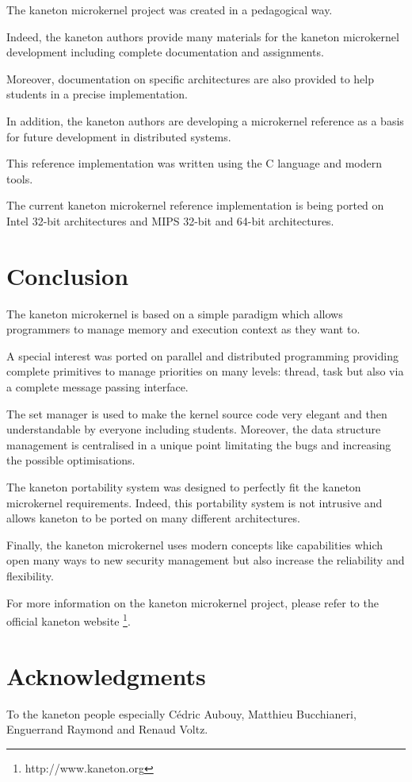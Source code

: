 \begin{multicols}{2}
The kaneton microkernel project was created in a pedagogical way.

Indeed, the kaneton authors provide many materials for the kaneton
microkernel development including complete documentation and assignments.

Moreover, documentation on specific architectures are also provided
to help students in a precise implementation.

In addition, the kaneton authors are developing a microkernel reference
as a basis for future development in distributed systems.

This reference implementation was written using the C language and
modern tools.

The current kaneton microkernel reference implementation is being
ported on Intel 32-bit architectures and MIPS 32-bit and 64-bit architectures.

%
%

\section{Conclusion}

The kaneton microkernel is based on a simple paradigm which allows
programmers to manage memory and execution context as they want to.

A special interest was ported on parallel and distributed programming
providing complete primitives to manage priorities on many levels:
thread, task \etc{} but also via a complete message passing interface.

The set manager is used to make the kernel source code very elegant
and then understandable by everyone including students. Moreover, the
data structure management is centralised in a unique point limitating
the bugs and increasing the possible optimisations.

The kaneton portability system was designed to perfectly fit the
kaneton microkernel requirements. Indeed, this portability system
is not intrusive and allows kaneton to be ported on many different
architectures.

Finally, the kaneton microkernel uses modern concepts like
capabilities which open many ways to new security management but
also increase the reliability and flexibility.

For more information on the kaneton microkernel project, please refer
to the official kaneton website
  \footnote{http://www.kaneton.org}.

%
%

\section{Acknowledgments}

To the kaneton people especially C\'edric Aubouy, Matthieu Bucchianeri,
Enguerrand Raymond and Renaud Voltz.

\end{multicols}


